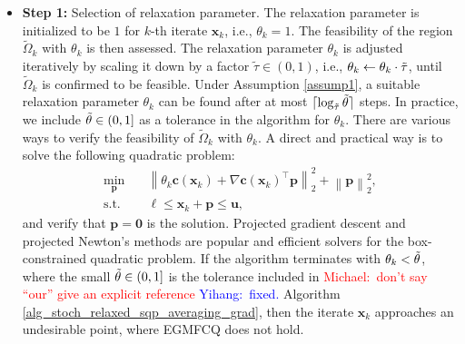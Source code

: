 \documentclass[aos]{imsart}
\numberwithin{equation}{section}
\theoremstyle{plain}
\newcommand{\michael}[1]{\textcolor{red}{Michael:\ #1}}
\newcommand{\yihang}[1]{\textcolor{blue}{Yihang:\ #1}}
\begin{document}
\begin{itemize}
    \item \textbf{Step 1:} Selection of relaxation parameter. The relaxation parameter is initialized to be $1$ for $k$-th iterate $\bm{x}_k$, i.e., $\theta_k = 1$. 
    The feasibility of the region $\widetilde{\Omega}_k$ with $\theta_k$ is then assessed. The relaxation parameter $\theta_k$ is adjusted iteratively by scaling it down by a factor $\tilde{\tau} \in (0,1)$, i.e., $\theta_k \leftarrow \theta_k \cdot \Tilde{\tau}$, until $\widetilde{\Omega}_k$ is confirmed to be feasible. 
    Under Assumption \ref{assump1}, a suitable relaxation parameter $\theta_k$ can be found after at most $\lceil \log_{\Tilde{\tau}} \Tilde{\theta} \rceil$ steps. In practice, we include $\Tilde{\theta} \in (0,1]$ as a tolerance in the algorithm for $\theta_k$. There are various ways to verify the feasibility of $\widetilde{\Omega}_k$ with $\theta_k$. A direct and practical way is to solve the following quadratic problem:
    \begin{equation*}
    \begin{split}
        \min_{\bm{p}} &  \hspace{1em} \left\| \theta_k \bm{c}(\bm{x}_k)+\nabla \bm{c}(\bm{x}_k)^{\top}\bm{p} \right\|_2^2 + \left\| \bm{p} \right\|_2^2,\\
        \text{s.t.} & \hspace{1em} \bm{\ell} \leq \bm{x}_k + \bm{p} \leq \bm{u},
    \end{split}
    \end{equation*}
    and verify that $\bm{p} = \bm{0}$ is the solution. Projected gradient descent and projected Newton's methods are popular and efficient solvers for the box-constrained quadratic problem. If the algorithm terminates with $\theta_k < \Tilde{\theta}$, where the small $\Tilde{\theta} \in (0,1]$ is the tolerance included in 
\michael{don't say ``our'' give an explicit reference} \yihang{fixed.}
Algorithm \ref{alg_stoch_relaxed_sqp_averaging_grad}, then the iterate $\bm{x}_k$ approaches an undesirable point, where EGMFCQ does not hold. 


\end{itemize}
\end{document}
